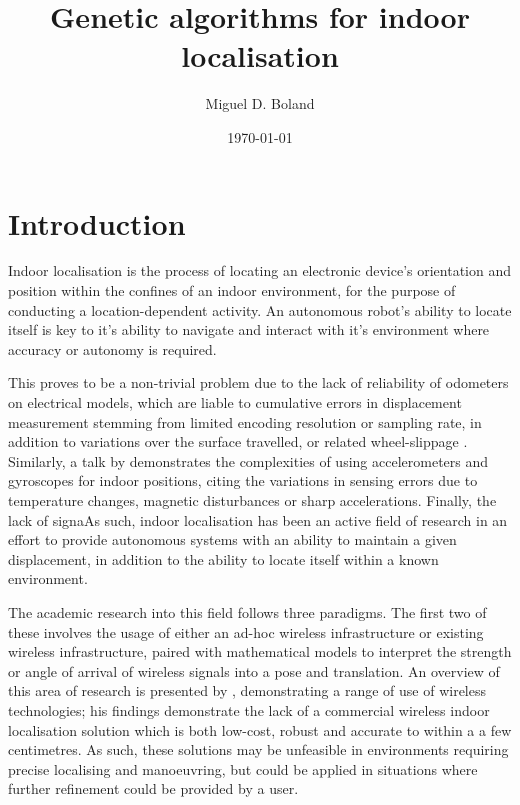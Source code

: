 \documentclass[authoryearcitations]{UoYCSproject}
\author{Miguel D. Boland}
\title{Genetic algorithms for indoor localisation}
\date{\today}
\begin{document}
\maketitle
\listoffigures
\listoftables


\chapter{Introduction}
\label{cha:Introduction}
Indoor localisation is the process of locating an electronic device's orientation and position within the confines of an indoor environment, for the purpose of conducting a location-dependent activity. An autonomous robot's ability to locate itself is key to it's ability to navigate and interact with it's environment where accuracy or autonomy is required. 

This proves to be a non-trivial problem due to the lack of reliability of odometers on electrical models, which are liable to cumulative errors in displacement measurement stemming from limited encoding resolution or sampling rate, in addition to variations over the surface travelled, or related wheel-slippage \cite{Borenstein1996-al}. Similarly, a talk by \citet{Sachs2010-pw} demonstrates the complexities of using accelerometers and gyroscopes for indoor positions, citing the variations in sensing errors due to temperature changes, magnetic disturbances or sharp accelerations. Finally, the lack of signaAs such, indoor localisation has been an active field of research in an effort to provide autonomous systems with an ability to maintain a given displacement, in addition to the ability to locate itself within a known environment. 

The academic research into this field follows three paradigms. The first two of these involves the usage of either an ad-hoc wireless infrastructure or existing wireless infrastructure, paired with mathematical models to interpret the strength or angle of arrival of wireless signals into a pose and translation. An overview of this area of research is presented by \citet{Liu2007-in}, demonstrating a range of use of wireless technologies; his findings demonstrate the lack of a commercial wireless indoor localisation solution which is both low-cost, robust and accurate to within a a few centimetres. As such, these solutions may be unfeasible in environments requiring precise localising and manoeuvring, but could be applied in situations where further refinement could be provided by a user.
\end{document}

